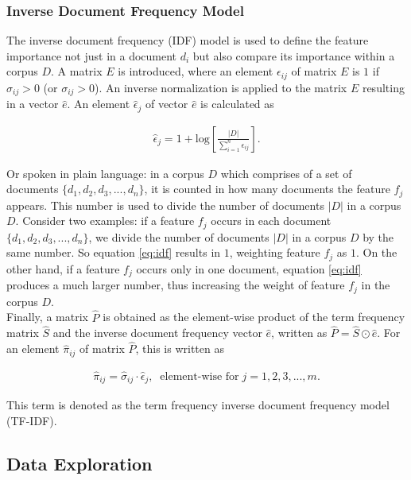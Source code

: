 \documentclass[a4paper,12pt,nottoc]{article}
\begin{document}
\subsubsection{Inverse Document Frequency Model}

The inverse document frequency (IDF) model is used to define the feature importance not just in a document $d_i$ but also compare its importance within a corpus $D$. A matrix $E$ is introduced, where an element $\epsilon_{ij}$ of matrix $E$ is $1$ if $\hat{\sigma}_{ij} > 0$ (or $\sigma_{ij} > 0$). An inverse normalization is applied to the matrix $E$ resulting in a vector $\hat{e}$. An element $\hat{\epsilon}_{j}$ of vector $\hat{e}$ is calculated as

\begin{gather}\label{eq:idf}
\hat{\epsilon}_{j} = 1 + \textrm{log}\left[\frac{|D|}{\sum_{i=1}^{n}\epsilon_{ij}}\right].
\end{gather}

\noindent Or spoken in plain language: in a corpus $D$ which comprises of a set of documents $\{d_1, d_2, d_3, ..., d_n\}$, it is counted in how many documents the feature $f_j$ appears. This number is used to divide the number of documents $|D|$ in a corpus $D$. Consider two examples: if a feature $f_j$ occurs in each document $\{d_1, d_2, d_3, ..., d_n\}$, we divide the number of documents $|D|$ in a corpus $D$ by the same number. So equation \ref{eq:idf} results in $1$, weighting feature $f_j$ as $1$. On the other hand, if a feature $f_j$ occurs only in one document, equation \ref{eq:idf} produces a much larger number, thus increasing the weight of feature $f_j$ in the corpus $D$.\\

\noindent Finally, a matrix $\hat{P}$ is obtained as the element-wise product of the term frequency matrix $\hat{S}$ and the inverse document frequency vector $\hat{e}$, written as $\hat{P} = \hat{S} \odot \hat{e}$. For an element $\hat{\pi}_{ij}$ of matrix $\hat{P}$, this is written as

\begin{gather}\label{eq:tf-idf}
\hat{\pi}_{ij} = \hat{\sigma}_{ij} \cdot \hat{\epsilon}_{j},\;\;\textrm{element-wise for}\;j = 1, 2, 3, ..., m .
\end{gather}

\noindent This term is denoted as the term frequency inverse document frequency model (TF-IDF).

\subsection{Data Exploration}
\end{document}
